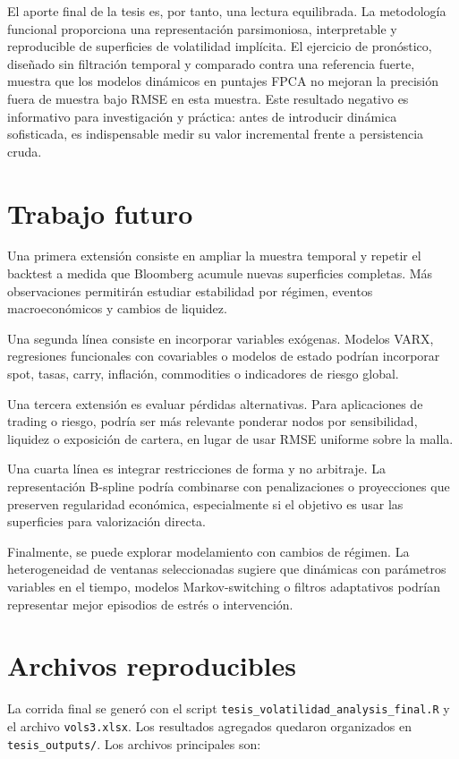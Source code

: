 \documentclass[a4paper,11pt]{article}
\begin{document}
El aporte final de la tesis es, por tanto, una lectura equilibrada. La metodología funcional proporciona una representación parsimoniosa, interpretable y reproducible de superficies de volatilidad implícita. El ejercicio de pronóstico, diseñado sin filtración temporal y comparado contra una referencia fuerte, muestra que los modelos dinámicos en puntajes FPCA no mejoran la precisión fuera de muestra bajo RMSE en esta muestra. Este resultado negativo es informativo para investigación y práctica: antes de introducir dinámica sofisticada, es indispensable medir su valor incremental frente a persistencia cruda.

\section{Trabajo futuro}

Una primera extensión consiste en ampliar la muestra temporal y repetir el backtest a medida que Bloomberg acumule nuevas superficies completas. Más observaciones permitirán estudiar estabilidad por régimen, eventos macroeconómicos y cambios de liquidez.

Una segunda línea consiste en incorporar variables exógenas. Modelos VARX, regresiones funcionales con covariables o modelos de estado podrían incorporar spot, tasas, carry, inflación, commodities o indicadores de riesgo global.

Una tercera extensión es evaluar pérdidas alternativas. Para aplicaciones de trading o riesgo, podría ser más relevante ponderar nodos por sensibilidad, liquidez o exposición de cartera, en lugar de usar RMSE uniforme sobre la malla.

Una cuarta línea es integrar restricciones de forma y no arbitraje. La representación B-spline podría combinarse con penalizaciones o proyecciones que preserven regularidad económica, especialmente si el objetivo es usar las superficies para valorización directa.

Finalmente, se puede explorar modelamiento con cambios de régimen. La heterogeneidad de ventanas seleccionadas sugiere que dinámicas con parámetros variables en el tiempo, modelos Markov-switching o filtros adaptativos podrían representar mejor episodios de estrés o intervención.

\appendix
\section{Archivos reproducibles}

La corrida final se generó con el script \texttt{tesis\_volatilidad\_analysis\_final.R} y el archivo \texttt{vols3.xlsx}. Los resultados agregados quedaron organizados en \texttt{tesis\_outputs/}. Los archivos principales son:
\end{document}
